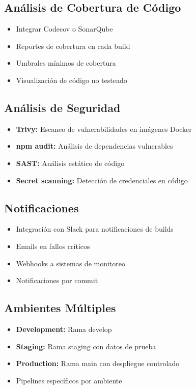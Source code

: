 \documentclass[12pt,a4paper]{article}
\begin{document}
\subsection{Análisis de Cobertura de Código}

\begin{itemize}
    \item Integrar Codecov o SonarQube
    \item Reportes de cobertura en cada build
    \item Umbrales mínimos de cobertura
    \item Visualización de código no testeado
\end{itemize}

\subsection{Análisis de Seguridad}

\begin{itemize}
    \item \textbf{Trivy:} Escaneo de vulnerabilidades en imágenes Docker
    \item \textbf{npm audit:} Análisis de dependencias vulnerables
    \item \textbf{SAST:} Análisis estático de código
    \item \textbf{Secret scanning:} Detección de credenciales en código
\end{itemize}

\subsection{Notificaciones}

\begin{itemize}
    \item Integración con Slack para notificaciones de builds
    \item Emails en fallos críticos
    \item Webhooks a sistemas de monitoreo
    \item Notificaciones por commit
\end{itemize}

\subsection{Ambientes Múltiples}

\begin{itemize}
    \item \textbf{Development:} Rama develop
    \item \textbf{Staging:} Rama staging con datos de prueba
    \item \textbf{Production:} Rama main con despliegue controlado
    \item Pipelines específicos por ambiente
\end{itemize}
\end{document}
